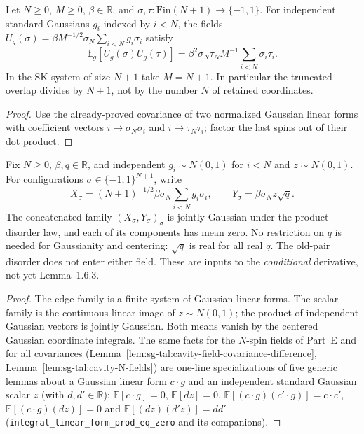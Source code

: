 \begin{lemma}
\label{lem:sg-tal:cavity-covariance}
  \leanok
{}
Let $N\ge0$, $M\ge0$, $\beta\in\mathbb R$, and
$\sigma,\tau:\mathrm{Fin}(N+1)\to\{-1,1\}$. For independent standard
Gaussians $g_i$ indexed by $i<N$, the fields
$U_g(\sigma)=\beta M^{-1/2}\sigma_N\sum_{i<N}g_i\sigma_i$ satisfy
\[
\mathbb E_g[U_g(\sigma)U_g(\tau)]
=\beta^2\sigma_N\tau_N M^{-1}\sum_{i<N}\sigma_i\tau_i.
\]
In the SK system of size $N+1$ take $M=N+1$. In particular the truncated
overlap divides by $N+1$, not by the number $N$ of retained coordinates.
\end{lemma}
\begin{proof}
  \leanok
Use the already-proved covariance of two normalized Gaussian linear forms
with coefficient vectors $i\mapsto\sigma_N\sigma_i$ and
$i\mapsto\tau_N\tau_i$; factor the last spins out of their dot product.
\end{proof}

\begin{lemma}
\label{lem:sg-tal:cavity-fields-gaussian}
  \leanok
{}
Fix $N\ge0$, $\beta,q\in\mathbb R$, and independent $g_i\sim N(0,1)$
for $i<N$ and $z\sim N(0,1)$. For configurations
$\sigma\in\{-1,1\}^{N+1}$, write
\[
X_\sigma=(N+1)^{-1/2}\beta\sigma_N\sum_{i<N}g_i\sigma_i,
\qquad Y_\sigma=\beta\sigma_N z\sqrt q.
\]
The concatenated family $(X_\sigma,Y_\sigma)_\sigma$ is jointly Gaussian
under the product disorder law, and each of its components has mean zero.
No restriction on $q$ is needed for Gaussianity and centering: $\sqrt q$ is real
for all real $q$. The old-pair disorder does not enter either field.
These are inputs to the \emph{conditional} derivative, not yet Lemma~1.6.3.
\end{lemma}
\begin{proof}
  \leanok
The edge family is a finite system of Gaussian linear forms. The scalar
family is the continuous linear image of $z\sim N(0,1)$; the product
of independent Gaussian vectors is jointly Gaussian. Both means vanish
by the centered Gaussian coordinate integrals.
The same facts for the $N$-spin fields of Part~E and for all covariances (Lemma~\ref{lem:sg-tal:cavity-field-covariance-difference},
Lemma~\ref{lem:sg-tal:cavity-N-fields}) are one-line specializations of five generic lemmas about a Gaussian linear
form $c\cdot g$ and an independent standard Gaussian scalar $z$ (with $d,d'\in\mathbb R$):
$\mathbb E[c\cdot g]=0$, $\mathbb E[dz]=0$, $\mathbb E[(c\cdot g)(c'\cdot g)]=c\cdot c'$,
$\mathbb E[(c\cdot g)(dz)]=0$ and $\mathbb E[(dz)(d'z)]=dd'$ (\texttt{integral\_linear\_form\_prod\_eq\_zero} and its companions).
\end{proof}

